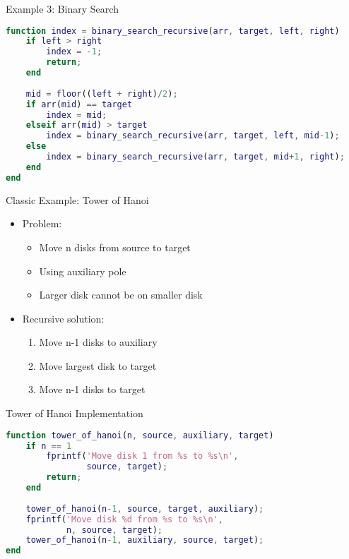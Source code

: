 \documentclass[10pt]{beamer}
\begin{document}
\begin{frame}[fragile]{Example 3: Binary Search}
    \begin{lstlisting}[language=Matlab]
function index = binary_search_recursive(arr, target, left, right)
    if left > right
        index = -1;
        return;
    end
    
    mid = floor((left + right)/2);
    if arr(mid) == target
        index = mid;
    elseif arr(mid) > target
        index = binary_search_recursive(arr, target, left, mid-1);
    else
        index = binary_search_recursive(arr, target, mid+1, right);
    end
end
    \end{lstlisting}
\end{frame}

\begin{frame}{Classic Example: Tower of Hanoi}
    \begin{itemize}
        \item Problem:
        \begin{itemize}
            \item Move n disks from source to target
            \item Using auxiliary pole
            \item Larger disk cannot be on smaller disk
        \end{itemize}
        \item Recursive solution:
        \begin{enumerate}
            \item Move n-1 disks to auxiliary
            \item Move largest disk to target
            \item Move n-1 disks to target
        \end{enumerate}
    \end{itemize}
\end{frame}

\begin{frame}[fragile]{Tower of Hanoi Implementation}
    \begin{lstlisting}[language=Matlab]
function tower_of_hanoi(n, source, auxiliary, target)
    if n == 1
        fprintf('Move disk 1 from %s to %s\n', 
                source, target);
        return;
    end
    
    tower_of_hanoi(n-1, source, target, auxiliary);
    fprintf('Move disk %d from %s to %s\n', 
            n, source, target);
    tower_of_hanoi(n-1, auxiliary, source, target);
end
    \end{lstlisting}
\end{frame}
\end{document}
